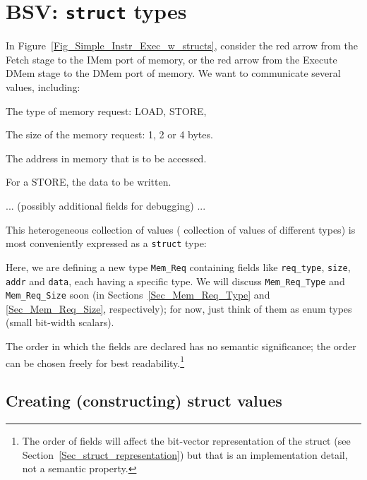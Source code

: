 
\section{BSV: {\tt struct} types}

\label{BSV_struct_types}
\label{Sec_Mem_Req}

In Figure~\ref{Fig_Simple_Instr_Exec_w_structs}, consider the red
arrow from the Fetch stage to the IMem port of memory, or the red
arrow from the Execute DMem stage to the DMem port of memory.  We want
to communicate several values, including:

\begin{tightlist}
 \item The type of memory request: LOAD, STORE, {\etc}
 \item The size of the memory request: 1, 2 or 4 bytes.
 \item The address in memory that is to be accessed.
 \item For a STORE, the data to be written.
 \item ... (possibly additional fields for debugging) ...
\end{tightlist}


This heterogeneous collection of values ({\ie} collection of values of
different types) is most conveniently expressed as a \verb|struct|
type:


Here, we are defining a new type {\tt Mem\_Req} containing fields like
{\tt req\_type}, {\tt size}, {\tt addr} and {\tt data}, each having a
specific type.  We will discuss \verb|Mem_Req_Type| and
\verb|Mem_Req_Size| soon (in Sections~\ref{Sec_Mem_Req_Type} and
\ref{Sec_Mem_Req_Size}, respectively); for now, just think of them as
enum types (small bit-width scalars).

The order in which the fields are declared has no semantic
significance; the order can be chosen freely for best
readability.\footnote{The order of fields will affect the bit-vector
representation of the struct (see
Section~\ref{Sec_struct_representation}) but that is an implementation
detail, not a semantic property.}


\subsection{Creating (constructing) struct values}

